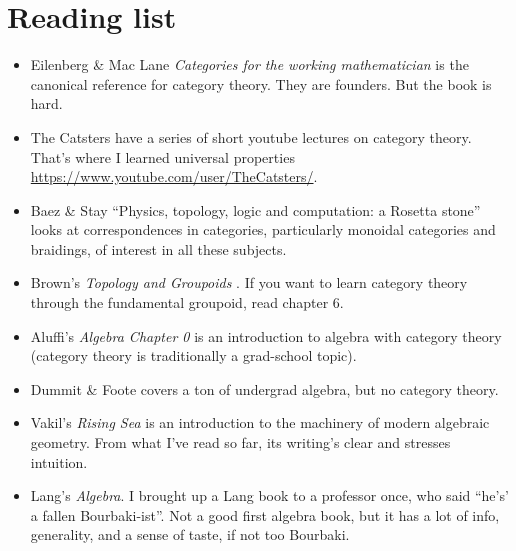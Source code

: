 \documentclass[a5paper]{scrartcl}
\def\book#1{\textit{#1}}
\begin{document}
\section{Reading list}
\begin{itemize}
  \item Eilenberg \& Mac Lane \book{Categories for the working mathematician} \cite{working} is the canonical reference for category theory. They are founders. But the book is hard.
  \item The Catsters have a series of short youtube lectures on category theory. That's where I learned universal properties \url{https://www.youtube.com/user/TheCatsters/}.
  \item Baez \& Stay ``Physics, topology, logic and computation: a Rosetta stone'' \cite{rosetta} looks at correspondences in categories, particularly monoidal categories and braidings, of interest in all these subjects.

  \item Brown's \book{Topology and Groupoids} \cite{groupoid}. If you want to learn category theory through the fundamental groupoid, read chapter 6.

  \item Aluffi's \book{Algebra Chapter 0} is an introduction to algebra with category theory (category theory is traditionally a grad-school topic).

  \item Dummit \& Foote \cite{dummit+foote} covers a ton of undergrad algebra, but no category theory.

  \item Vakil's \book{Rising Sea} is an introduction to the machinery of modern algebraic geometry. From what I've read so far, its  writing's clear and stresses intuition.

  \item Lang's \book{Algebra}. I brought up a Lang book to a professor once, who said  ``he's' a fallen Bourbaki-ist''. Not a good first algebra book, but it has a lot of info, generality, and a sense of taste, if not too Bourbaki.

\end{itemize}
\printbibliography
\end{document}
